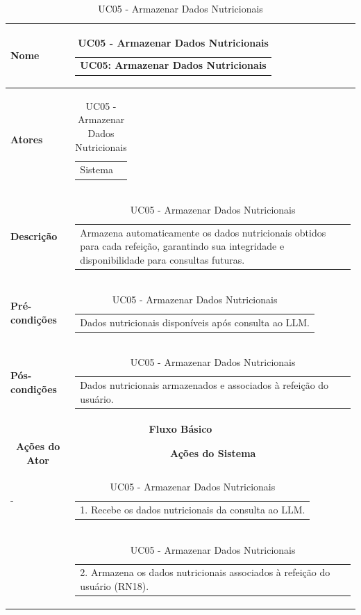 \begin{longtable}[c]{|p{}|p{}|}
\caption{UC05 - Armazenar Dados Nutricionais}
\label{tab:uc05}\\
\hline
\multicolumn{1}{|p{0.48\textwidth}|}{\textbf{Nome}} &
  \begin{tabular}[c]{@{}p{}@{}}UC05: Armazenar Dados Nutricionais\end{tabular} \\ \hline
\endfirsthead
\endhead
\multicolumn{1}{|p{0.48\textwidth}|}{\textbf{Atores}} &
  \begin{tabular}[c]{@{}p{}@{}}Sistema\end{tabular} \\ \hline
\multicolumn{1}{|p{0.48\textwidth}|}{\textbf{Descrição}} &
  \begin{tabular}[c]{@{}p{}@{}}Armazena automaticamente os dados nutricionais obtidos para cada refeição, garantindo sua integridade e disponibilidade para consultas futuras.\end{tabular} \\ \hline
\multicolumn{1}{|p{0.48\textwidth}|}{\textbf{Pré-condições}} &
  \begin{tabular}[c]{@{}p{}@{}}Dados nutricionais disponíveis após consulta ao LLM.\end{tabular} \\ \hline
\multicolumn{1}{|p{0.48\textwidth}|}{\textbf{Pós-condições}} &
  \begin{tabular}[c]{@{}p{}@{}}Dados nutricionais armazenados e associados à refeição do usuário.\end{tabular} \\ \hline
\multicolumn{2}{|c|}{\textbf{Fluxo Básico}} \\ \hline
\multicolumn{1}{|c|}{\textbf{Ações do Ator}} &
  \multicolumn{1}{c|}{\textbf{Ações do Sistema}} \\ \hline
\multicolumn{1}{|p{0.48\textwidth}|}{-} &
  \begin{tabular}[c]{@{}p{}@{}}1. Recebe os dados nutricionais da consulta ao LLM.\end{tabular} \\ \hline
\multicolumn{1}{|p{0.48\textwidth}|}{} &
  \begin{tabular}[c]{@{}p{}@{}}2. Armazena os dados nutricionais associados à refeição do usuário (RN18).\end{tabular} \\ \hline

\end{longtable}
